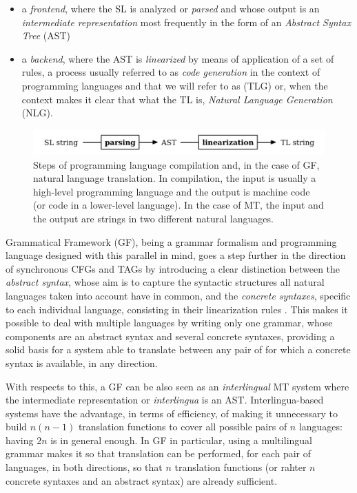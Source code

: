\begin{itemize}
    \item a \textit{frontend}, where the SL is analyzed or \textit{parsed} and whose output is an \textit{intermediate representation} most frequently in the form of an \textit{Abstract Syntax Tree} (AST)
    \item a \textit{backend}, where the AST is \textit{linearized} by means of application of a set of rules, a process usually referred to as \textit{code generation} in the context of programming languages and that we will refer to as  (TLG) or, when the context makes it clear that what the TL is, \textit{Natural Language Generation} (NLG). \smallskip
\end{itemize}
\begin{figure}[H]
    \centering
    \includegraphics[width=.8\linewidth]{figure/compiler.png}
    \caption[Steps of programming language compilation and, in the case of GF, natural language translation]{Steps of programming language compilation and, in the case of GF, natural language translation. In compilation, the input is usually a high-level programming language and the output is machine code (or code in a lower-level language). In the case of MT, the input and the output are strings in two different natural languages.} \label{compilerd}
\end{figure}

Grammatical Framework (GF), being a grammar formalism and programming language designed with this parallel in mind, goes a step further in the direction of synchronous CFGs and TAGs by introducing a clear distinction between the \textit{abstract syntax}, whose aim is to capture the syntactic structures all natural languages taken into account have in common, and the \textit{concrete syntaxes}, specific to each individual language, consisting in their linearization rules \cite{gf2004} \cite{gfbook}. 
This makes it possible to deal with multiple languages by writing only one grammar, whose components are an abstract syntax and several concrete syntaxes, providing a solid basis for a system able to translate between any pair of for which a concrete syntax is available, in any direction. \smallskip

With respects to this, a GF can be also seen as an \textit{interlingual} MT system where the intermediate representation or \textit{interlingua} is an AST. Interlingua-based systems have the advantage, in terms of efficiency, of making it unnecessary to build $n (n - 1)$ translation functions to cover all possible pairs of $n$ languages: having $2n$ is in general enough. In GF in particular, using a multilingual grammar makes it so that translation can be performed, for each pair of languages, in both directions, so that $n$ translation functions (or rahter $n$ concrete syntaxes and an abstract syntax) are already sufficient.\smallskip

